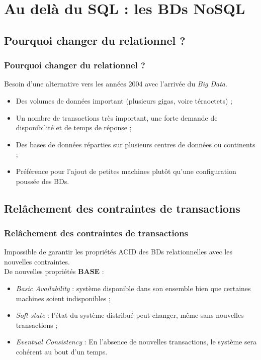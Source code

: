 \documentclass[handout]{beamer}
\begin{document}
	\section{Au delà du SQL : les BDs NoSQL}

		\subsection{Pourquoi changer du relationnel ?}
		\begin{frame}
			\frametitle{Pourquoi changer du relationnel ?}

			Besoin d'une alternative vers les années 2004 avec l'arrivée du \textit{Big Data}.
			\begin{itemize}
				\item Des volumes de données important (plusieurs gigas, voire téraoctets) ;
				\item Un nombre de transactions très important, une forte demande de disponibilité et de temps de réponse ;
				\item Des bases de données réparties sur plusieurs centres de données ou continents ;
				\item Préférence pour l'ajout de petites machines plutôt qu'une configuration poussée des BDs.
			\end{itemize}

		\end{frame}

		\subsection{Relâchement des contraintes de transactions}
		\begin{frame}
			\frametitle{Relâchement des contraintes de transactions}

			Impossible de garantir les propriétés ACID des BDs relationnelles avec les nouvelles contraintes.\\
			\vspace{10px}
			De nouvelles propriétés \textbf{BASE} :
			\begin{itemize}
				\item \textit{Basic Availability} : système disponible dans son ensemble bien que certaines machines soient indisponibles ;
				\item \textit{Soft state} : l'état du système distribué peut changer, même sans nouvelles transactions ;
				\item \textit{Eventual Consistency} : En l'absence de nouvelles transactions, le système sera cohérent au bout d'un temps.
			\end{itemize}

		\end{frame}
\end{document}
